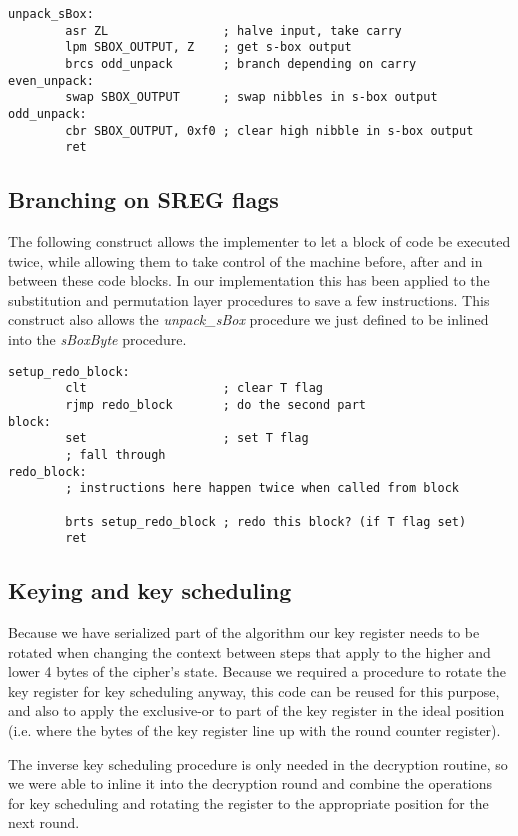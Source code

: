 \documentclass{article}
\begin{document}
\begin{lstlisting}
unpack_sBox:
        asr ZL                ; halve input, take carry
        lpm SBOX_OUTPUT, Z    ; get s-box output
        brcs odd_unpack       ; branch depending on carry
even_unpack:
        swap SBOX_OUTPUT      ; swap nibbles in s-box output
odd_unpack:
        cbr SBOX_OUTPUT, 0xf0 ; clear high nibble in s-box output
        ret
\end{lstlisting}

\subsection{Branching on SREG flags}
The following construct allows the implementer to let a block of code be executed twice, while allowing them to take control of the machine before, after and in between these code blocks.
In our implementation this has been applied to the substitution and permutation layer procedures to save a few instructions.
This construct also allows the \textit{unpack\_sBox} procedure we just defined to be inlined into the \textit{sBoxByte} procedure.

\begin{lstlisting}
setup_redo_block:
        clt                   ; clear T flag
        rjmp redo_block       ; do the second part
block:
        set                   ; set T flag
        ; fall through
redo_block:
        ; instructions here happen twice when called from block

        brts setup_redo_block ; redo this block? (if T flag set)
        ret
\end{lstlisting}

\subsection{Keying and key scheduling}
Because we have serialized part of the algorithm our key register needs to be rotated when changing the context between steps that apply to the higher and lower 4 bytes of the cipher's state.
Because we required a procedure to rotate the key register for key scheduling anyway, this code can be reused for this purpose, and also to apply the exclusive-or to part of the key register in the ideal position (i.e. where the bytes of the key register line up with the round counter register).

The inverse key scheduling procedure is only needed in the decryption routine, so we were able to inline it into the decryption round and combine the operations for key scheduling and rotating the register to the appropriate position for the next round.
\end{document}
